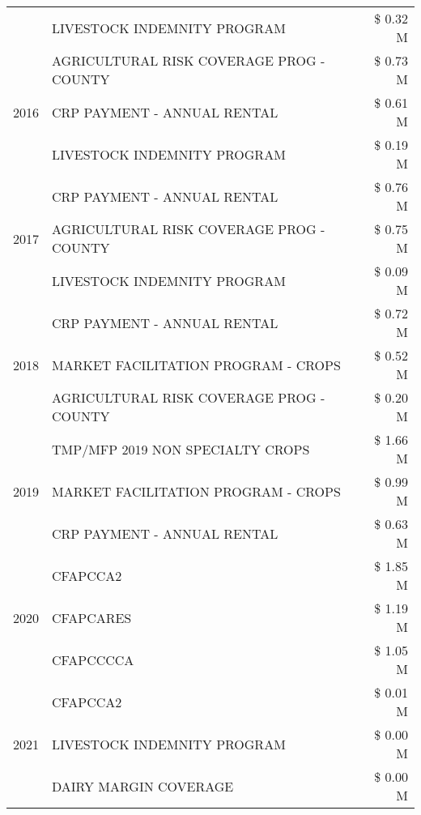 \begin{tabular}{llr}
 & LIVESTOCK INDEMNITY PROGRAM & \$ 0.32 M \\
\cline{1-3}
\multirow[t]{3}{*}{2016} & AGRICULTURAL RISK COVERAGE PROG - COUNTY & \$ 0.73 M \\
 & CRP PAYMENT - ANNUAL RENTAL & \$ 0.61 M \\
 & LIVESTOCK INDEMNITY PROGRAM & \$ 0.19 M \\
\cline{1-3}
\multirow[t]{3}{*}{2017} & CRP PAYMENT - ANNUAL RENTAL & \$ 0.76 M \\
 & AGRICULTURAL RISK COVERAGE PROG - COUNTY & \$ 0.75 M \\
 & LIVESTOCK INDEMNITY PROGRAM & \$ 0.09 M \\
\cline{1-3}
\multirow[t]{3}{*}{2018} & CRP PAYMENT - ANNUAL RENTAL & \$ 0.72 M \\
 & MARKET FACILITATION PROGRAM - CROPS & \$ 0.52 M \\
 & AGRICULTURAL RISK COVERAGE PROG - COUNTY & \$ 0.20 M \\
\cline{1-3}
\multirow[t]{3}{*}{2019} & TMP/MFP 2019 NON SPECIALTY CROPS & \$ 1.66 M \\
 & MARKET FACILITATION PROGRAM - CROPS & \$ 0.99 M \\
 & CRP PAYMENT - ANNUAL RENTAL & \$ 0.63 M \\
\cline{1-3}
\multirow[t]{3}{*}{2020} & CFAPCCA2 & \$ 1.85 M \\
 & CFAPCARES & \$ 1.19 M \\
 & CFAPCCCCA & \$ 1.05 M \\
\cline{1-3}
\multirow[t]{3}{*}{2021} & CFAPCCA2 & \$ 0.01 M \\
 & LIVESTOCK INDEMNITY PROGRAM & \$ 0.00 M \\
 & DAIRY MARGIN COVERAGE & \$ 0.00 M \\
\cline{1-3}
\bottomrule
\end{tabular}
